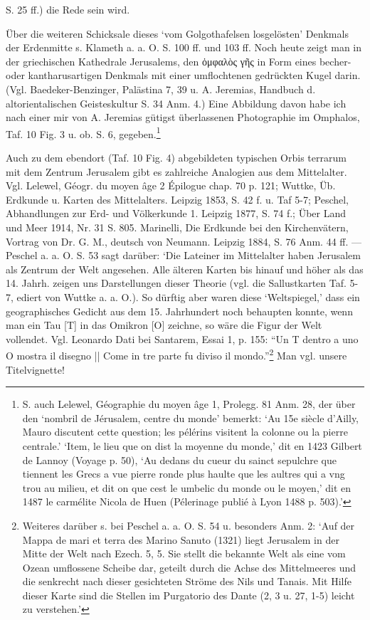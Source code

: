\documentclass[a4paper, 11pt, oneside]{article}
\begin{document}
S. 25 ff.) die Rede sein wird.

Über die weiteren Schicksale dieses `vom Golgothafelsen losgelösten' Denkmals der Erdenmitte s. Klameth a. a. O. S. 100 ff. und 103 ff. Noch heute zeigt man in der griechischen Kathedrale Jerusalems, den ὀμφαλὸς γῆς in Form eines becher- oder kantharusartigen Denkmals mit einer umflochtenen gedrückten Kugel darin. (Vgl. Baedeker-Benzinger, Palästina 7, 39 u. A. Jeremias, Handbuch d. altorientalischen Geisteskultur S. 34 Anm. 4.) Eine Abbildung davon habe ich nach einer mir von A. Jeremias gütigst überlassenen Photographie im Omphalos, Taf. 10 Fig. 3 u. ob. S. 6, gegeben.\footnote{S. auch Lelewel, Géographie du moyen âge 1, Prolegg. 81 Anm. 28, der über den `nombril de Jérusalem, centre du monde' bemerkt: `Au 15e siècle d'Ailly, Mauro discutent cette question; les pélérins visitent la colonne ou la pierre centrale.' `Item, le lieu que on dist la moyenne du monde,' dit en 1423 Gilbert de Lannoy (Voyage p. 50), `Au dedans du cueur du sainct sepulchre que tiennent les Grecs a vue pierre ronde plus haulte que les aultres qui a vng trou au milieu, et dit on que cest le umbelic du monde ou le moyen,' dit en 1487 le carmélite Nicola de Huen (Pélerinage publié à Lyon 1488 p. 503).'}

Auch zu dem ebendort (Taf. 10 Fig. 4) abgebildeten typischen Orbis terrarum mit dem Zentrum Jerusalem gibt es zahlreiche Analogien aus dem Mittelalter. Vgl. Lelewel, Géogr. du moyen âge 2 Épilogue chap. 70 p. 121; Wuttke, Üb. Erdkunde u. Karten des Mittelalters. Leipzig 1853, S. 42 f. u. Taf 5-7; Peschel, Abhandlungen zur Erd- und Völkerkunde 1. Leipzig 1877, S. 74 f.; Über Land und Meer 1914, Nr. 31 S. 805. Marinelli, Die Erdkunde bei den Kirchenvätern, Vortrag von Dr. G. M., deutsch von Neumann. Leipzig 1884, S. 76 Anm. 44 ff. --- Peschel a. a. O. S. 53 sagt darüber: `Die Lateiner im Mittelalter haben Jerusalem als Zentrum der Welt angesehen. Alle älteren Karten bis hinauf und höher als das 14. Jahrh. zeigen uns Darstellungen dieser Theorie (vgl. die Sallustkarten Taf. 5-7, ediert von Wuttke a. a. O.). So dürftig aber waren diese `Weltspiegel,' dass ein geographisches Gedicht aus dem 15. Jahrhundert noch behaupten konnte, wenn man ein Tau [T] in das Omikron [O] zeichne, so wäre die Figur der Welt vollendet. Vgl. Leonardo Dati bei Santarem, Essai 1, p. 155: "`Un T dentro a uno O mostra il disegno || Come in tre parte fu diviso il mondo."'\footnote{Weiteres darüber s. bei Peschel a. a. O. S. 54 u. besonders Anm. 2: `Auf der Mappa de mari et terra des Marino Sanuto (1321) liegt Jerusalem in der Mitte der Welt nach Ezech. 5, 5. Sie stellt die bekannte Welt als eine vom Ozean umflossene Scheibe dar, geteilt durch die Achse des Mittelmeeres und die senkrecht nach dieser gesichteten Ströme des Nils und Tanais. Mit Hilfe dieser Karte sind die Stellen im Purgatorio des Dante (2, 3 u. 27, 1-5) leicht zu verstehen.'} Man vgl. unsere Titelvignette!
\end{document}
